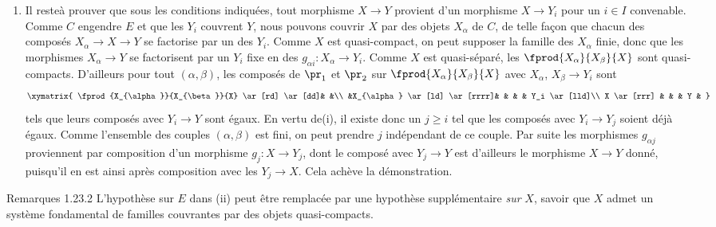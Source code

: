 \begin{enumerate}
\item Il reste\pageoriginale à prouver que sous les conditions indiquées, tout
  morphisme $X \to Y$ provient d'un morphisme $X \to Y_i$ pour un $i
  \in I$ convenable. Comme $C$ engendre $E$ et que les $Y_i$ couvrent
  $Y$, nous pouvons couvrir $X$ par des objets $X_{\alpha}$ de $C$, de
  telle façon que chacun des composés $X_{\alpha} \to X \to Y$ se
  factorise par un des $Y_i$. Comme $X$ est quasi-compact, on peut
  supposer la famille des $X_{\alpha}$ finie, donc que les morphismes
  $X_{\alpha} \to Y$ se factorisent par un $Y_i$ fixe en des
  $g_{\alpha i} : X_{\alpha} \to Y_i$. Comme $X$ est quasi-séparé, les
  $\fprod{X_{\alpha}}{X_{\beta}}{X}$ sont quasi-compacts. D'ailleurs
  pour tout $(\alpha, \beta)$, les composés de $\pr_1$ et $\pr_2$ sur
  $\fprod{X_{\alpha}}{X_{\beta}}{X}$ avec $X_{\alpha}$, $X_{\beta} \to
  Y_i$ sont
\[
\xymatrix{
\fprod{X_{\alpha}}{X_{\beta}}{X} \ar[rd] \ar[dd]& &\\
                            &X_{\alpha} \ar[ld] \ar[rrrr]&   & & & Y_i
\ar[lld]\\
X    \ar[rrr]                       &          & & Y  &
}
\]
tels que leurs composés avec $Y_i \to Y$ sont égaux. En
  vertu de(i), il existe donc un $j \geq i$ tel que les composés avec
  $Y_i \to Y_j$ soient déjà égaux. Comme l'ensemble des couples
  $(\alpha, \beta)$ est fini, on peut prendre $j$ indépendant de ce
  couple. Par suite les morphismes $g_{\alpha j}$ proviennent par
  composition d'un morphisme $g_j : X \to Y_j$, dont le composé avec
  $Y_j \to Y$ est d'ailleurs le morphisme $X \to Y$ donné, puisqu'il
  en est ainsi après composition avec les $Y_j \to X$. Cela achève la
  démonstration.
\end{enumerate}

\begin{enonce*}[remark]{Remarques 1.23.2}
L'hypothèse sur $E$ dans (ii) peut être remplacée par une hypothèse
supplémentaire \emph{sur} $X$, savoir que $X$ admet un système fondamental de
familles couvrantes par des objets quasi-compacts.
\end{enonce*}


